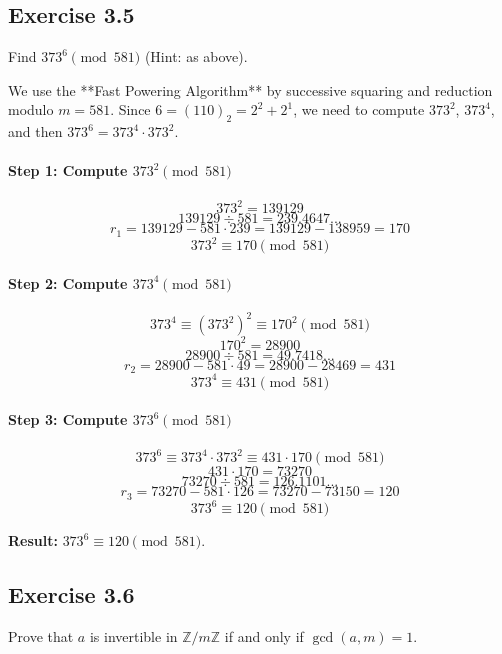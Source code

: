 \subsection*{Exercise 3.5}
Find $373^6 \pmod{581}$ (Hint: as above).

\begin{solution}
We use the **Fast Powering Algorithm** by successive squaring and reduction modulo $m=581$.
Since $6 = (110)_2 = 2^2 + 2^1$, we need to compute $373^2$, $373^4$, and then $373^6 = 373^4 \cdot 373^2$.

\paragraph{Step 1: Compute $373^2 \pmod{581}$}
$$ 373^2 = 139129 $$
$$ 139129 \div 581 = 239.4647... $$
$$ r_1 = 139129 - 581 \cdot 239 = 139129 - 138959 = 170 $$
$$ 373^2 \equiv 170 \pmod{581} $$

\paragraph{Step 2: Compute $373^4 \pmod{581}$}
$$ 373^4 \equiv (373^2)^2 \equiv 170^2 \pmod{581} $$
$$ 170^2 = 28900 $$
$$ 28900 \div 581 = 49.7418... $$
$$ r_2 = 28900 - 581 \cdot 49 = 28900 - 28469 = 431 $$
$$ 373^4 \equiv 431 \pmod{581} $$

\paragraph{Step 3: Compute $373^6 \pmod{581}$}
$$ 373^6 \equiv 373^4 \cdot 373^2 \equiv 431 \cdot 170 \pmod{581} $$
$$ 431 \cdot 170 = 73270 $$
$$ 73270 \div 581 = 126.1101... $$
$$ r_3 = 73270 - 581 \cdot 126 = 73270 - 73150 = 120 $$
$$ 373^6 \equiv 120 \pmod{581} $$

\textbf{Result:} $373^6 \equiv 120 \pmod{581}$.
\end{solution}
\newpage
\subsection*{Exercise 3.6}
Prove that $a$ is invertible in $\mathbb{Z}/m\mathbb{Z}$ if and only if $\gcd(a,m)=1$.

